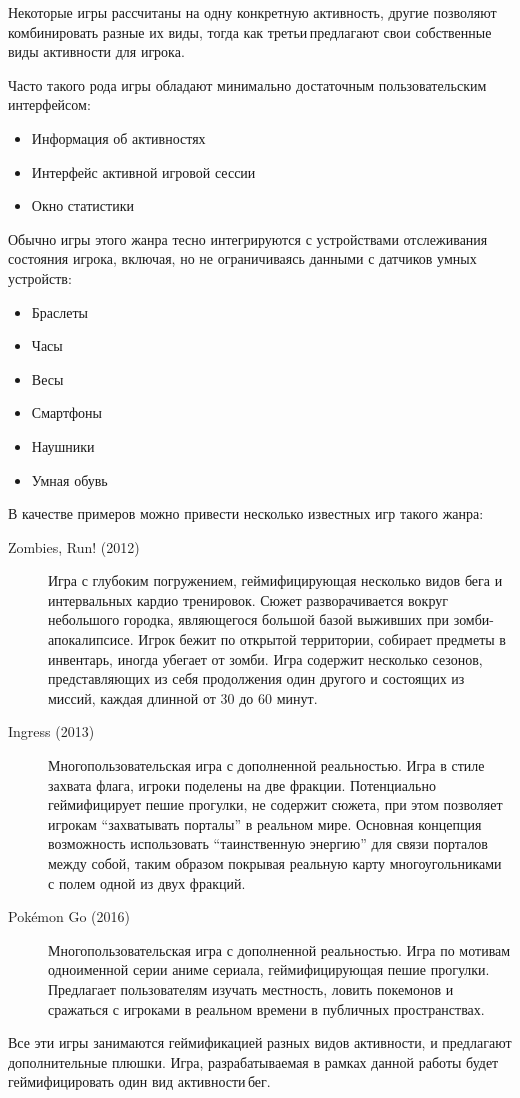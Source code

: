Некоторые игры рассчитаны на одну конкретную активность, другие \textendash\space позволяют комбинировать разные их виды, тогда как третьи\,\textendash\space предлагают свои собственные виды активности для игрока.


Часто такого рода игры обладают минимально достаточным пользовательским интерфейсом:
\begin{itemize}
	\item Информация об активностях
	\item Интерфейс активной игровой сессии
	\item Окно статистики
\end{itemize}

Обычно игры этого жанра тесно интегрируются с устройствами отслеживания состояния игрока, включая, но не ограничиваясь данными с датчиков умных устройств:
\begin{itemize}
	\item Браслеты
	\item Часы
	\item Весы
	\item Смартфоны
	\item Наушники
	\item Умная обувь
\end{itemize}


В качестве примеров можно привести несколько известных игр такого жанра: 
\begin{description}
	\item[Zombies, Run! (2012)] Игра с глубоким погружением, геймифицирующая несколько видов бега и интервальных кардио тренировок. Сюжет разворачивается вокруг небольшого городка, являющегося большой базой выживших при зомби-апокалипсисе. Игрок бежит по открытой территории, собирает предметы в инвентарь, иногда убегает от зомби. Игра содержит несколько сезонов, представляющих из себя продолжения один другого и состоящих из миссий, каждая длинной от 30 до 60 минут.
	\item[Ingress (2013)] Многопользовательская игра с дополненной реальностью. Игра в стиле захвата флага, игроки поделены на две фракции. Потенциально геймифицирует пешие прогулки, не содержит сюжета, при этом позволяет игрокам ``захватывать порталы'' в реальном мире. Основная концепция \textendash\space возможность использовать ``таинственную энергию'' для связи порталов между собой, таким образом покрывая реальную карту многоугольниками с полем одной из двух фракций.
	\item[Pokémon Go (2016)] Многопользовательская игра с дополненной реальностью. Игра по мотивам одноименной серии аниме сериала, геймифицирующая пешие прогулки. Предлагает пользователям изучать местность, ловить покемонов и сражаться с игроками в реальном времени в публичных пространствах.
\end{description}

Все эти игры занимаются геймификацией разных видов активности, и предлагают дополнительные плюшки. Игра, разрабатываемая в рамках данной работы будет геймифицировать один вид активности\,\textendash\space бег. 
